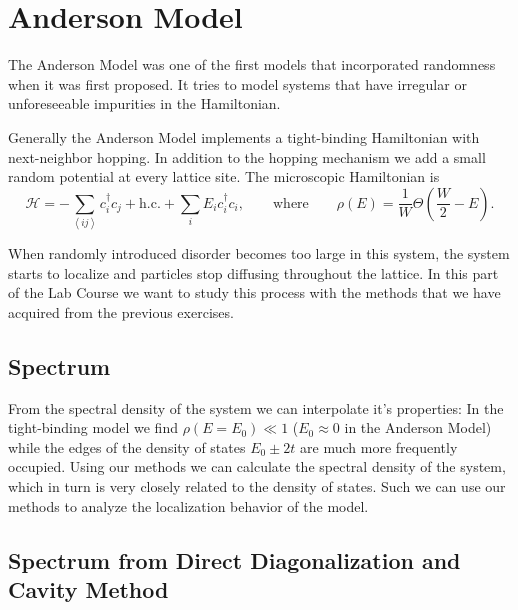 \documentclass[../main.tex]{subfiles}
\begin{document}
\section{Anderson Model}

The Anderson Model was one of the first models that incorporated randomness when it was first proposed.
It tries to model systems that have irregular or unforeseeable impurities in the Hamiltonian.
\par

Generally the Anderson Model implements a tight-binding Hamiltonian with next-neighbor hopping.
In addition to the hopping mechanism we add a small random potential at every lattice site.
The microscopic Hamiltonian is 
\[
    \mathcal{H} = -\sum\limits_{\left<i j \right>}^{ } c_i^{\dagger} c_j + \text{h.c.}  + \sum_{i}^{ }  E_i c_i^{\dagger} c_i, 
    \qquad \text{where} \qquad
    \rho(E) = \frac{1}{W}\Theta\left( \frac{W}{2} - E \right)
.\] 

When randomly introduced disorder becomes too large in this system, the system starts to localize and particles stop diffusing throughout the lattice.
In this part of the Lab Course we want to study this process with the methods that we have acquired from the previous exercises.


\subsection{Spectrum}

From the spectral density of the system we can interpolate it's properties:
In the tight-binding model we find $\rho(E=E_0) \ll 1$ ($E_0 \approx 0$ in the Anderson Model) while the edges of the density of states $E_0 \pm 2t$ are much more frequently occupied.
Using our methods we can calculate the spectral density of the system, which in turn is very closely related to the density of states.
Such we can use our methods to analyze the localization behavior of the model.


\subsection{Spectrum from Direct Diagonalization and Cavity Method}
\end{document}

